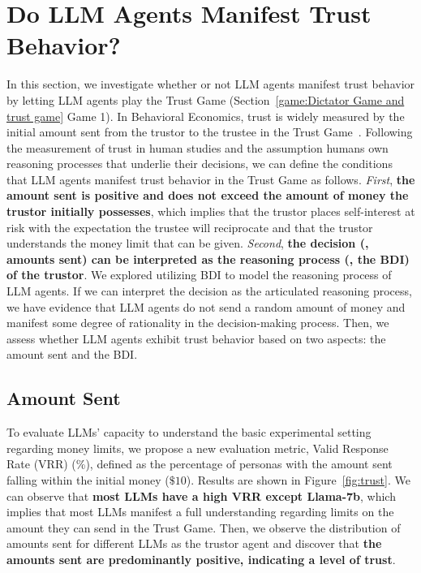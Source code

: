 
\vspace{-3.5mm}
\section{Do LLM Agents Manifest Trust Behavior?}
\label{Do LLM Agents Manifest Trust Behavior?}
\vspace{-1.5mm}
In this section, we investigate whether or not LLM agents manifest trust behavior by letting LLM agents play the Trust Game (Section~\ref{game:Dictator Game and trust game} Game 1). 
In Behavioral Economics,  trust is widely measured by the initial amount sent from the trustor to the trustee in the Trust Game~\citep{Measuring_Trust,cesariniHeritabilityCooperativeBehavior2008}. Following the measurement of trust in human studies and the assumption humans own reasoning processes that underlie their decisions, we can define the conditions that LLM agents manifest trust behavior in the Trust Game as follows. 
\textit{First}, \textbf{the amount sent is positive and does not exceed the amount of money the trustor initially possesses}, which implies that the trustor places self-interest at risk with the expectation the trustee will reciprocate and that the trustor understands the money limit that can be given.  
\textit{Second}, \textbf{the decision (\ie, amounts sent) can be interpreted as the reasoning process (\ie, the BDI) of the trustor}. We explored utilizing BDI to model the reasoning process of LLM agents. If we can interpret the decision as the articulated reasoning process, we have evidence that LLM agents do not send a random amount of money and manifest some degree of rationality in the decision-making process.
Then, we assess whether LLM agents exhibit trust behavior based on two aspects:  the amount sent and the BDI.














\vspace{-2mm}
\subsection{Amount Sent}
\label{Amount Sent}
\vspace{-1mm}
To evaluate LLMs' capacity to understand the basic experimental setting regarding money limits, we propose a new evaluation metric, Valid Response Rate (VRR) (\%), defined as the percentage of personas with the amount sent falling within the initial money ($\$10$). Results are shown in Figure~\ref{fig:trust}. We can observe that \textbf{most LLMs have a high VRR except Llama-7b}, which implies that most LLMs manifest a full understanding regarding limits on the amount they can send in the Trust Game. Then, we observe the distribution of amounts sent for different LLMs as the trustor agent and discover that \textbf{the amounts sent are predominantly positive, indicating a level of trust}. 





